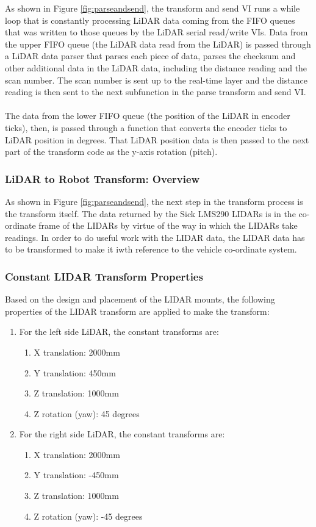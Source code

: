 \noindent As shown in Figure \ref{fig:parseandsend}, the transform and send VI runs a while loop that is constantly processing LiDAR data coming from the FIFO queues that was written to those queues by the LiDAR serial read/write VIs. Data from the upper FIFO queue (the LiDAR data read from the LiDAR) is passed through a LiDAR data parser that parses each piece of data, parses the checksum and other additional data in the LiDAR data, including the distance reading and the scan number. The scan number is sent up to the real-time layer and the distance reading is then sent to the next subfunction in the parse transform and send VI. \\ \\
%
The data from the lower FIFO queue (the position of the LiDAR in encoder ticks), then, is passed through a function that converts the encoder ticks to LiDAR position in degrees. That LiDAR position data is then passed to the next part of the transform code as the y-axis rotation (pitch).

\subsubsection{LiDAR to Robot Transform: Overview}
As shown in Figure \ref{fig:parseandsend}, the next step in the transform process is the transform itself. The data returned by the Sick LMS290 LIDARs is in the co-ordinate frame of the LIDARs by virtue of the way in which the LIDARs take readings. In order to do useful work with the LIDAR data, the LIDAR data has to be transformed to make it iwth reference to the vehicle co-ordinate system.

\subsubsection{Constant LIDAR Transform Properties}
Based on the design and placement of the LIDAR mounts, the following properties of the LIDAR transform are applied to make the transform:

\begin{enumerate}
\item For the left side LiDAR, the constant transforms are:
\begin{enumerate}
\item X translation: 2000mm
\item Y translation: 450mm
\item Z translation: 1000mm
\item Z rotation (yaw): 45 degrees
\end{enumerate}
\item For the right side LiDAR, the constant transforms are:
\begin{enumerate}
\item X translation: 2000mm
\item Y translation: -450mm
\item Z translation: 1000mm
\item Z rotation (yaw): -45 degrees
\end{enumerate}
\end{enumerate}

